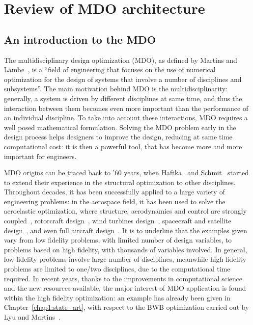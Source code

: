 \chapter{Review of MDO architecture}
\label{app:mdo_rev}


\section{An introduction to the MDO}
\label{sec:app2_mdo_intro}
The multidisciplinary design optimization (MDO), as defined by Martins and Lambe~\cite{bib:martins_mdo}, is a ``field of engineering that focuses on the use of numerical optimization for the design of systems that involve a number of disciplines and subsystems''.
The main motivation behind MDO is the multidisciplinarity: generally, a system is driven by different disciplines at same time, and thus the interaction between them becomes even more important than the performance of an individual discipline. 
To take into account these interactions, MDO requires a well posed mathematical formulation. 
Solving the MDO problem early in the design process helps designers to improve the design, reducing at same time computational cost: it is then a powerful tool, that has become more and more important for engineers.  

MDO origins can be traced back to '60 years, when Haftka~\cite{bib:haftka_1973, bib:haftka_1975, bib:haftka_1977, bib:haftka_1979} and Schmit~\cite{bib:schmit_1960, bib:schmit_1965, bib:schmit_1981, bib:schmit_1984} started to extend their experience in the structural optimization to other disciplines. 
Throughout decades, it has been successfully applied to a large variety of engineering problems: in the aerospace field, it has been used to solve the aeroelastic optimization, where structure, aerodynamics and control are strongly coupled~\cite{bib:ashley, bib:green, bib:grossman_1988, bib:grossman_1990, bib:livne_1990, bib:livne_1999, bib:jansen_2010, bib:ning}, rotorcraft design~\cite{bib:ganguli}, wind turbines design~\cite{bib:fuglsang}, spacecraft and satellite design~\cite{bib:braun, bib:hwang_satellite}, and even full aircraft design~\cite{bib:kroo, bib:manning, bib:antoine, bib:henderson, bib:alonso}.  
It is to underline that the examples given vary from low fidelity problems, with limited number of design variables, to problems based on high fidelity, with thousands of variables involved. 
In general, low fidelity problems involve large number of disciplines, meanwhile high fidelity problems are limited to one/two disciplines, due to the computational time required. 
In recent years, thanks to the improvements in computational science and the new resources available, the major interest of MDO application is found within the high fidelity optimization: an example has already been given in Chapter~\ref{chap1:state_art}, with respect to the BWB optimization carried out by Lyu and Martins~\cite{bib:lyu}. 

